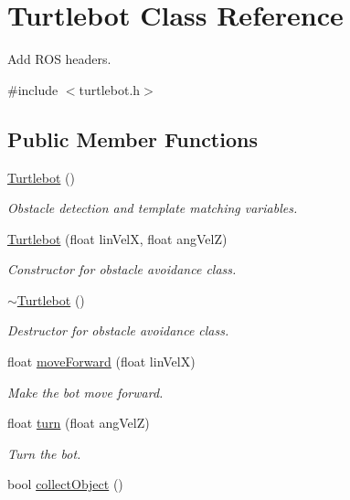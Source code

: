 \hypertarget{classTurtlebot}{}\section{Turtlebot Class Reference}
\label{classTurtlebot}


Add R\+OS headers.  




{\ttfamily \#include $<$turtlebot.\+h$>$}

\subsection*{Public Member Functions}
\begin{DoxyCompactItemize}
\item 
\hyperlink{classTurtlebot_a683061fc512bfb8d2a35134e783767ff}{Turtlebot} ()
\begin{DoxyCompactList}\small\item\em Obstacle detection and template matching variables. \end{DoxyCompactList}\item 
\hyperlink{classTurtlebot_a5c5d2e07560cf7dd661fa5c16b56f486}{Turtlebot} (float lin\+VelX, float ang\+VelZ)
\begin{DoxyCompactList}\small\item\em Constructor for obstacle avoidance class. \end{DoxyCompactList}\item 
\hyperlink{classTurtlebot_a86b905efdcfab4dc1d4c9f7687902f94}{$\sim$\+Turtlebot} ()
\begin{DoxyCompactList}\small\item\em Destructor for obstacle avoidance class. \end{DoxyCompactList}\item 
float \hyperlink{classTurtlebot_ab55e08a3b52c24ef094f591b8945a0e9}{move\+Forward} (float lin\+VelX)
\begin{DoxyCompactList}\small\item\em Make the bot move forward. \end{DoxyCompactList}\item 
float \hyperlink{classTurtlebot_a793fbcacdfb213d377d3d12e38957a88}{turn} (float ang\+VelZ)
\begin{DoxyCompactList}\small\item\em Turn the bot. \end{DoxyCompactList}\item 
bool \hyperlink{classTurtlebot_a7aa654d1ae90e2e380c3d46d2fd17a71}{collect\+Object} ()

\end{DoxyCompactItemize}
